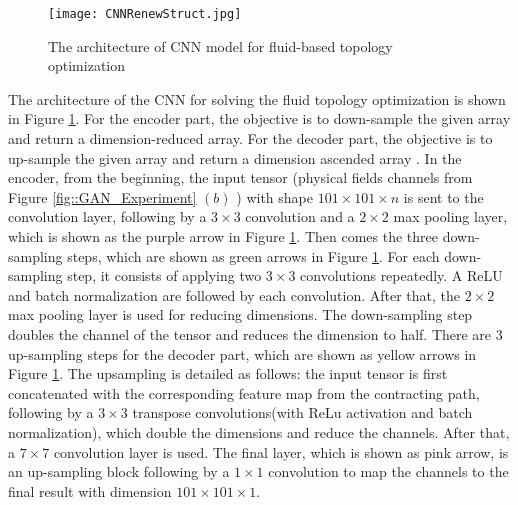 \documentclass{article}
\begin{document}
\begin{figure}
    \centering
    \texttt{[image: CNNRenewStruct.jpg]}
    \caption{The architecture of CNN model for fluid-based topology optimization}
    \label{fig::CNN}
\end{figure}
The architecture of the CNN for solving the fluid topology optimization is shown in Figure \ref{fig::CNN}. For the encoder part, the objective is to down-sample the given array and return a dimension-reduced array. For the decoder part, the objective is to up-sample the given array and return a dimension ascended array \cite{3-TopoCNN-wang2022deep}. In the encoder,  from the beginning, the input tensor (physical fields channels from Figure \ref{fig::GAN_Experiment} $(b)$ ) with shape $101 \times 101 \times n$ is sent to the convolution layer, following by a $3 \times 3$ convolution and a $2 \times 2$ max pooling layer, which is shown as the purple arrow in Figure \ref{fig::CNN}. Then comes the three down-sampling steps, which are shown as green arrows in Figure \ref{fig::CNN}. For each down-sampling step, it consists of applying two $3 \times 3$ convolutions repeatedly. A ReLU and batch normalization are followed by each convolution. After that, the $2 \times 2$ max pooling layer is used for reducing dimensions. The down-sampling step doubles the channel of the tensor and reduces the dimension to half.  
There are 3 up-sampling steps for the decoder part, which are shown as yellow arrows in Figure \ref{fig::CNN}. The upsampling is detailed as follows: the input tensor is first concatenated with the corresponding feature map from the contracting path, following by a $3 \times 3$ transpose convolutions(with ReLu activation and batch normalization), which double the dimensions and reduce the channels. After that, a $7 \times 7$ convolution layer is used. The final layer, which is shown as pink arrow, is an up-sampling block following by a $1 \times 1$ convolution to map the channels to the final result with dimension $101 \times 101 \times 1$.
\end{document}
